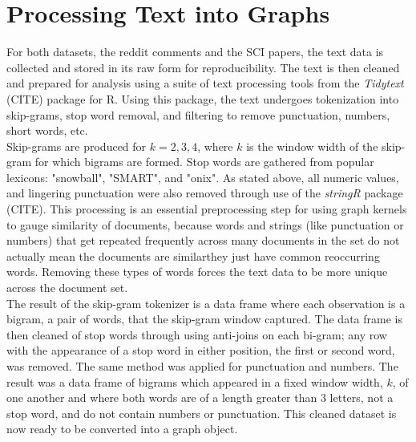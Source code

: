 %
%
%

\section{Processing Text into Graphs}

For both datasets, the reddit comments and the SCI papers, the text data is collected and stored in its raw form for reproducibility. The text is then cleaned and prepared for analysis using a suite of text processing tools from the \textit{Tidytext} (CITE) package for R. Using this package, the text undergoes tokenization into skip-grams, stop word removal, and filtering to remove punctuation, numbers, short words, etc. \\
Skip-grams are produced for $k=2,3,4$, where $k$ is the window width of the skip-gram for which bigrams are formed. Stop words are gathered from popular lexicons: "snowball", "SMART", and "onix". As stated above, all numeric values, and lingering punctuation were also removed through use of the \textit{stringR} package (CITE). This processing is an essential preprocessing step for using graph kernels to gauge similarity of documents, because words and strings (like punctuation or numbers) that get repeated frequently across many documents in the set do not actually mean the documents are similar\textemdash they just have common reoccurring words. Removing these types of words forces the text data to be more unique across the document set.  \\
The result of the skip-gram tokenizer is a data frame where each observation is a bigram, a pair of words, that the skip-gram window captured. The data frame is then cleaned of stop words through using anti-joins on each bi-gram; any row with the appearance of a stop word in either position, the first or second word, was removed. The same method was applied for punctuation and numbers. The result was a data frame of bigrams which appeared in a fixed window width, $k$, of one another and where both words are of a length greater than 3 letters, not a stop word, and do not contain numbers or punctuation. This cleaned dataset is now ready to be converted into a graph object. \\
